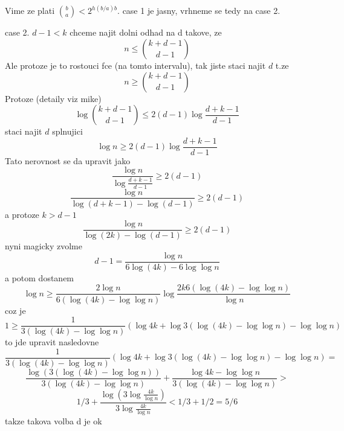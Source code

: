\documentclass[11pt,a4paper]{article}
\date{\today}
\begin{document}
\def\1{\mathbb{1}}
\def\R{\mathbb{R}}
\def\<{\left<}
\def\>{\right>}
\newcommand{\RL}{\mbox{{\sf RL}}}
\newcommand{\BPL}{\mbox{{\sf BPL}}}
\newcommand{\Log}{\mbox{{\sf L}}}
\newcommand{\NCo}{\mbox{{\sf NC$^1$}}}
\newcommand{\RNC}{\mbox{{\sf RNC$^1$}}}
\newcommand{\SC}{\mbox{{\sf SC}}}


 \def\D{\tilde{D}}
\def\hD{\hat{D}}
\def\hR{\hat{R}}

\def\supp{{\rm{supp}}}
\def\rank{{\rm{rank}}}

\def\prl{\|}
Vime ze plati ${{b}\choose{a}} <2^{h(b/a)b}$.
case 1 je jasny, vrhneme se tedy na case 2.

case 2. $d-1<k$  chceme najit dolni odhad na d takove, ze 
$$ n \leq {k+d-1 \choose d-1}$$
Ale protoze je to rostouci fce (na tomto intervalu), tak jiste staci najit $d$ t.ze 
$$ n \ge {k+d-1 \choose d-1}$$
Protoze (detaily viz mike) 
$$\log {k+d-1 \choose d-1}\leq 2(d-1) \log\frac{d+k-1}{d-1}$$
staci najit $d$ splnujici
$$\log n\ge 2(d-1) \log\frac{d+k-1}{d-1}$$
Tato nerovnost se da upravit jako 
$$\frac{\log n}{\log\frac{d+k-1}{d-1}}\ge 2(d-1) $$
$$\frac{\log n}{\log({d+k-1})-\log({d-1})}\ge 2(d-1) $$
a protoze $k>d-1$
$$\frac{\log n}{\log({2k})-\log({d-1})}\ge 2(d-1) $$
nyni magicky zvolme
$$d-1 = \frac {\log n }{6\log (4k) - 6 \log \log n}$$
a potom dostanem
$$\log n \ge \frac{2\log n}{6(\log (4k) -\log \log n)} \log \frac{2k6(\log (4k)- \log \log n)}{\log n}$$
coz je 
$$ 1\ge \frac{1}{3(\log (4k) -\log \log n)} (\log 4k + \log 3(\log (4k)- \log \log n) - \log \log n)$$
to jde upravit nasledovne
$$\frac{1}{3(\log (4k) -\log \log n)} (\log 4k + \log 3(\log (4k)- \log \log n) - \log \log n)=$$
$$\frac{\log (3(\log (4k)- \log \log n))}{3(\log (4k) -\log \log n)} + \frac{\log 4k - \log \log n}{3(\log (4k) -\log \log n)}>$$
$$1/3+\frac{\log(3\log\frac{4k}{\log n})}{3\log\frac{4k}{\log n}}<1/3+1/2 = 5/6$$
takze takova volba d je ok
\end{document}
